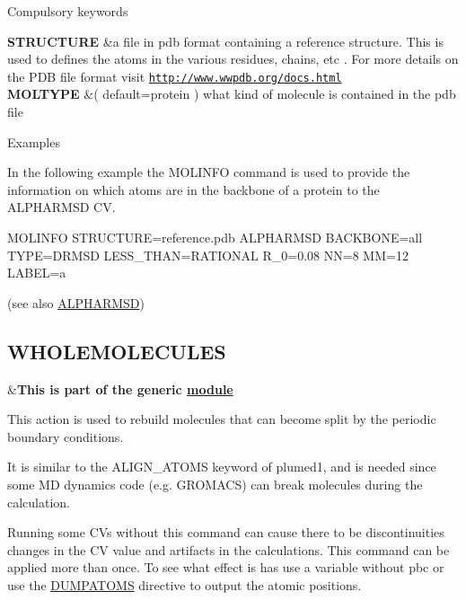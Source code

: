 \begin{DoxyParagraph}{Compulsory keywords}

\end{DoxyParagraph}
\begin{TabularC}{2}
\hline
{\bfseries  S\+T\+R\+U\+C\+T\+U\+R\+E } &a file in pdb format containing a reference structure. This is used to defines the atoms in the various residues, chains, etc . For more details on the P\+D\+B file format visit \href{http://www.wwpdb.org/docs.html}{\tt http\+://www.\+wwpdb.\+org/docs.\+html}   \\
{\bfseries  M\+O\+L\+T\+Y\+P\+E } &( default=protein ) what kind of molecule is contained in the pdb file   \\
\end{TabularC}


\begin{DoxyParagraph}{Examples}

\end{DoxyParagraph}
In the following example the M\+O\+L\+I\+N\+F\+O command is used to provide the information on which atoms are in the backbone of a protein to the A\+L\+P\+H\+A\+R\+M\+S\+D C\+V.

\begin{DoxyVerb}MOLINFO STRUCTURE=reference.pdb
ALPHARMSD BACKBONE=all TYPE=DRMSD LESS_THAN={RATIONAL R_0=0.08 NN=8 MM=12} LABEL=a 
\end{DoxyVerb}
 (see also \hyperlink{ALPHARMSD}{A\+L\+P\+H\+A\+R\+M\+S\+D}) \hypertarget{WHOLEMOLECULES}{}\subsection{W\+H\+O\+L\+E\+M\+O\+L\+E\+C\+U\+L\+E\+S}\label{WHOLEMOLECULES}
\begin{TabularC}{2}
\hline
&{\bfseries  This is part of the generic \hyperlink{mymodules}{module }}   \\
\end{TabularC}
This action is used to rebuild molecules that can become split by the periodic boundary conditions.

It is similar to the A\+L\+I\+G\+N\+\_\+\+A\+T\+O\+M\+S keyword of plumed1, and is needed since some M\+D dynamics code (e.\+g. G\+R\+O\+M\+A\+C\+S) can break molecules during the calculation.

Running some C\+Vs without this command can cause there to be discontinuities changes in the C\+V value and artifacts in the calculations. This command can be applied more than once. To see what effect is has use a variable without pbc or use the \hyperlink{DUMPATOMS}{D\+U\+M\+P\+A\+T\+O\+M\+S} directive to output the atomic positions.


